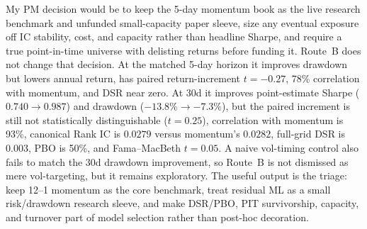 \documentclass[9pt]{extarticle}
\begin{document}
My PM decision would be to keep the 5-day momentum book as the live research
benchmark and unfunded small-capacity paper sleeve, size any eventual exposure
off IC stability, cost, and capacity rather than headline Sharpe, and require a
true point-in-time universe with delisting returns before funding it. Route~B
does not change that decision. At the matched 5-day horizon it improves drawdown
but lowers annual return, has paired return-increment $t=-0.27$, 78\% correlation
with momentum, and DSR near zero. At 30d it improves point-estimate Sharpe
($0.740\rightarrow0.987$) and drawdown ($-13.8\%\rightarrow-7.3\%$), but the
paired increment is still not statistically distinguishable ($t=0.25$),
correlation with momentum is 93\%, canonical Rank IC is $0.0279$ versus
momentum's $0.0282$, full-grid DSR is $0.003$, PBO is 50\%, and Fama--MacBeth
$t=0.05$. A naive vol-timing control also fails to match the 30d drawdown
improvement, so Route~B is not dismissed as mere vol-targeting, but it remains
exploratory. The useful output is the triage: keep 12--1 momentum as the core
benchmark, treat residual ML as a small risk/drawdown research sleeve, and make
DSR/PBO, PIT survivorship, capacity, and turnover part of model selection rather
than post-hoc decoration.
\end{document}
